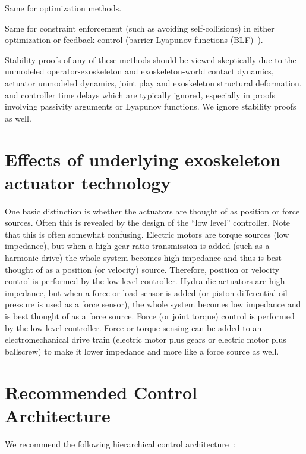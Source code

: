 \documentclass[letterpaper,12pt,fullpage]{article}
\begin{document}
Same for optimization methods.

Same for constraint enforcement (such as avoiding self-collisions)
in either optimization or feedback control (barrier
Lyapunov functions (BLF)~\cite{IEEE06911561}).

Stability proofs of any of these methods should be viewed skeptically due
to the unmodeled operator-exoskeleton and exoskeleton-world contact dynamics, 
actuator unmodeled dynamics, joint play and exoskeleton
structural deformation, and controller
time delays which are typically ignored, especially in proofs involving
passivity arguments or Lyapunov functions.
We ignore stability proofs as well.





\section{Effects of underlying exoskeleton actuator technology}

One basic distinction is whether the actuators are thought of as position
or force sources. Often this is revealed by the design of the ``low level''
controller. Note that this is often somewhat confusing. Electric motors
are torque sources (low impedance), but when a high gear ratio transmission
is added (such as a harmonic drive) the whole system becomes high impedance
and thus is best thought of as a position (or velocity) source. Therefore,
position or velocity 
control is performed by the low level controller. Hydraulic actuators
are high impedance, but when a force or load sensor is added (or piston differential
oil pressure is used as a force sensor), the whole system becomes low impedance
and is best thought of as a force source. Force (or joint torque) control is
performed by the low level controller. Force or torque sensing can be added to an
electromechanical drive train (electric motor plus gears or electric
motor plus ballscrew)
to make it lower impedance and more like a force source as well.

\section{Recommended Control Architecture}
\label{sec:architecture}

We recommend the following hierarchical control architecture~\cite{IEEE06907051}:
\end{document}

